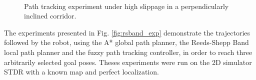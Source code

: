 \documentclass[conference]{IEEEtran}
\begin{document}
\begin{figure}[!ht]
	\centering
	\\[-0.05cm]%
	\caption{Path tracking experiment under high slippage in a perpendicularly inclined corridor.}
	\label{fig:ptc_exp2}
\end{figure}

The experiments presented in Fig. \ref{fig:rsband_exp} demonstrate the trajectories followed by the robot, using the A* global path planner, the Reeds-Shepp Band local path planner and the fuzzy path tracking controller, in order to reach three arbitrarily selected goal poses. Theses experiments were run on the 2D simulator STDR with a known map and perfect localization.
\end{document}
